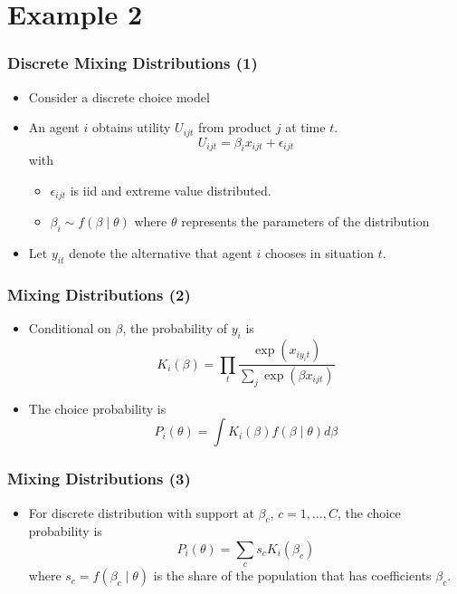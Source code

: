 \documentclass{beamer}
\newcommand{\1}{\mathbb{1}}
\begin{document}
\section{Example 2}


\begin{frame}\frametitle{Discrete Mixing Distributions (1)}
\begin{itemize}
 \item Consider a discrete choice model
 \item An agent $i$ obtains utility $U_{ijt}$ from product $j$ at time $t$. 
 \begin{equation*}
  U_{ijt} = \beta_i x_{ijt} + \epsilon_{ijt}  
 \end{equation*}
 with 
\begin{itemize}
\item $\epsilon_{ijt}$ is iid and extreme value distributed. 
\item $\beta_i \sim f(\beta \mid \theta)$ where $\theta$ represents the parameters of the distribution 
\end{itemize}
\item Let $y_{it}$ denote the alternative that agent $i$ chooses in situation $t$.
\end{itemize}
\end{frame}

\begin{frame}\frametitle{Mixing Distributions (2)}
\begin{itemize}
 \item Conditional on $\beta$, the probability of $y_i$ is 
 \begin{equation}
  K_i(\beta) = \prod_{t} \dfrac{\exp(x_{i y_i t})}{\sum_j \exp(\beta x_{ijt})}
 \end{equation}
 \item The choice probability is 
\begin{equation*}
P_i(\theta) = \int K_i(\beta) f(\beta \mid \theta) d\beta
\end{equation*}
\end{itemize}
\end{frame}

\begin{frame}\frametitle{Mixing Distributions (3)}
\begin{itemize}
 \item For discrete distribution with support at $\beta_c$, $c= 1,\ldots,C$, the choice probability is 
\begin{equation}
 P_i(\theta) = \sum_c s_c K_i(\beta_c)
\end{equation}
 where $s_c =  f(\beta_c \mid \theta)$ is the share of the population that has coefficients $\beta_c$. 
\end{itemize}
\end{frame}
\end{document}
